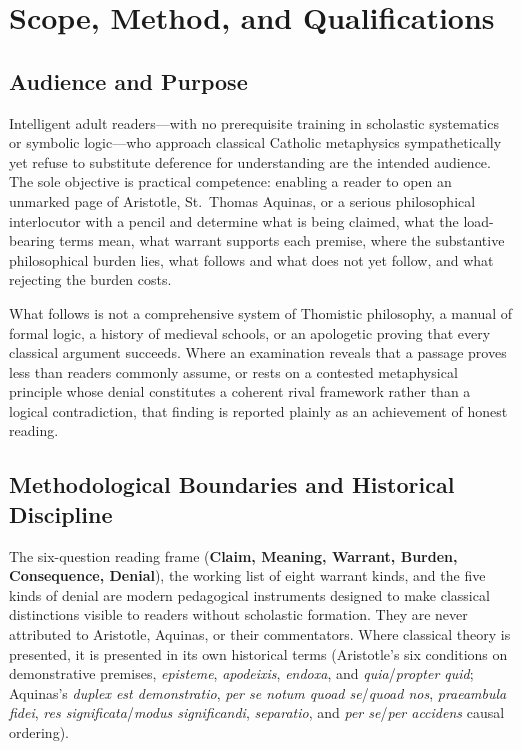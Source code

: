 \section{Scope, Method, and Qualifications}

\subsection*{Audience and Purpose}

Intelligent adult readers---with no prerequisite training in scholastic systematics or symbolic logic---who approach classical Catholic metaphysics sympathetically yet refuse to substitute deference for understanding are the intended audience. The sole objective is practical competence: enabling a reader to open an unmarked page of Aristotle, St.\ Thomas Aquinas, or a serious philosophical interlocutor with a pencil and determine what is being claimed, what the load-bearing terms mean, what warrant supports each premise, where the substantive philosophical burden lies, what follows and what does not yet follow, and what rejecting the burden costs.

What follows is not a comprehensive system of Thomistic philosophy, a manual of formal logic, a history of medieval schools, or an apologetic proving that every classical argument succeeds. Where an examination reveals that a passage proves less than readers commonly assume, or rests on a contested metaphysical principle whose denial constitutes a coherent rival framework rather than a logical contradiction, that finding is reported plainly as an achievement of honest reading.

\subsection*{Methodological Boundaries and Historical Discipline}

The six-question reading frame (\textbf{Claim, Meaning, Warrant, Burden, Consequence, Denial}), the working list of eight warrant kinds, and the five kinds of denial are modern pedagogical instruments designed to make classical distinctions visible to readers without scholastic formation. They are never attributed to Aristotle, Aquinas, or their commentators. Where classical theory is presented, it is presented in its own historical terms (Aristotle's six conditions on demonstrative premises, \emph{episteme}, \emph{apodeixis}, \emph{endoxa}, and \emph{quia}/\emph{propter quid}; Aquinas's \emph{duplex est demonstratio}, \emph{per se notum quoad se}/\emph{quoad nos}, \emph{praeambula fidei}, \emph{res significata}/\emph{modus significandi}, \emph{separatio}, and \emph{per se}/\emph{per accidens} causal ordering).

